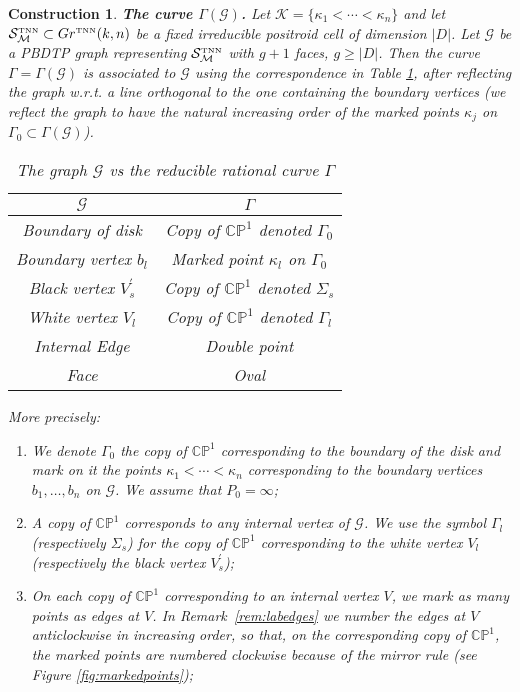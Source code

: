 \documentclass[11pt]{amsart}
\theoremstyle{plain}
\numberwithin{equation}{section}
\newtheorem{construction}{Construction}[subsection]
\def \GTNN {{Gr^{\mbox{\tiny TNN}} (k,n)}}
\def \S {{\mathcal S}_{\mathcal M}^{\mbox{\tiny TNN}}}
\begin{document}
\begin{construction}\label{def:gamma}\textbf{The curve $\Gamma(\mathcal G)$.}
Let ${\mathcal K} =\{\kappa_1 < \cdots < \kappa_n\}$ and let ${\mathcal S}^{\mbox {\tiny TNN}}_{{\mathcal M}}\subset \GTNN$ be a fixed irreducible positroid cell of dimension $|D|$. Let ${\mathcal G}$ be a PBDTP graph representing $\S$ with $g+1$ faces, $g\ge|D|$. Then the curve $\Gamma = \Gamma ({\mathcal G})$ is associated to ${\mathcal G}$ using the correspondence in Table \ref{table:LeG}, after reflecting the graph w.r.t. a line orthogonal to the one containing the boundary vertices (we reflect the graph to have the natural increasing order of the marked points $\kappa_j$ on $\Gamma_0\subset\Gamma(\mathcal G)$).
\begin{table}%
\caption{The graph ${\mathcal G}$  vs the reducible rational curve $\Gamma$} 
\centering
\begin{tabular}{|c|c|}
\hline\hline
$\mathcal G$ & $\Gamma$ \\[0.5ex]
\hline
Boundary of disk & Copy of $\mathbb{CP}^1$ denoted $\Gamma_0$ \\
Boundary vertex $b_l$             & Marked point $\kappa_l$ on  $\Gamma_0$\\
Black vertex   $V^{\prime}_{s}$   & Copy of $\mathbb{CP}^1$ denoted $\Sigma_{s}$\\
White vertex   $V_{l}$            & Copy of $\mathbb{CP}^1$ denoted $\Gamma_{l}$\\
Internal Edge                     & Double point\\
Face                              & Oval\\ [1ex]
\hline
\end{tabular}
\label{table:LeG}
\end{table}
More precisely:
\begin{enumerate}
\item We denote $\Gamma_0$ the copy of $\mathbb{CP}^1$ corresponding to the boundary of the disk and mark on it the points $\kappa_1<\cdots <\kappa_n$ corresponding to the boundary vertices $b_1,\dots, b_n$ on $\mathcal G$. We assume that $P_0=\infty$; 
\item A copy of $\mathbb{CP}^1$ corresponds to any internal vertex of $\mathcal G$. We use the symbol $\Gamma_l$ (respectively $\Sigma_s$) for the copy of $\mathbb{CP}^1$ corresponding to the white vertex $V_l$ (respectively the black vertex $V^{\prime}_s$);
\item On each copy of $\mathbb{CP}^1$ corresponding to an internal vertex $V$, we mark as many points as edges at $V$. In Remark~\ref{rem:labedges} we number the edges at $V$ anticlockwise in increasing order, so that, on the corresponding copy of $\mathbb{CP}^1$, the marked points are numbered clockwise because of the mirror rule (see Figure \ref{fig:markedpoints});

\end{enumerate}
\end{construction}
\end{document}
